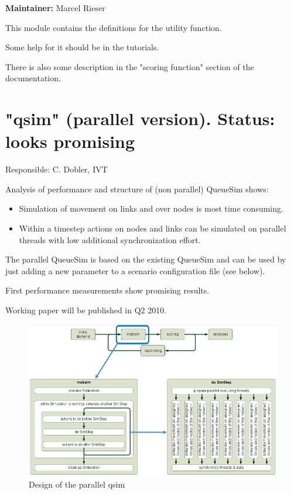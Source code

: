 \textbf{Maintainer:} Marcel Rieser

This module contains the definitions for the utility function.

Some help for it should be in the tutorials.

There is also some description in the "scoring function" section of the documentation.

\vfill\eject
\section{"qsim" (parallel version). Status: looks promising}

Responsible: C. Dobler, IVT

Analysis of performance and structure of (non parallel) QueueSim shows:
\begin{itemize}
	\item Simulation of movement on links and over nodes is most time consuming.
	\item Within a timestep actions on nodes and links can be simulated on parallel threads with low additional synchronization effort.
\end{itemize}

The  parallel QueueSim is based on the existing QueueSim and can be used by  just adding a new parameter to a scenario configuration file (see  below).

First performance measurements show promising results.

Working paper will be published in Q2 2010.

\begin{figure}[htp]
\includegraphics[width=\textwidth]{figures/qsimParallel/parallelqsim.png}
\caption{Design of the parallel qsim}
\end{figure}

